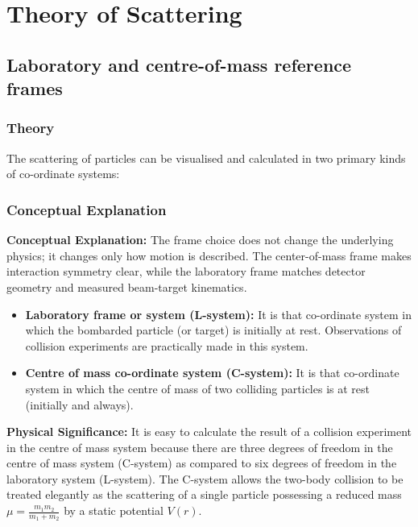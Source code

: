 \documentclass[12pt]{report}
\begin{document}
\endgroup

\tableofcontents
\newpage

\cleardoublepage
\hypersetup{pageanchor=true}
\setcounter{page}{1}

\chapter{Theory of Scattering}
\section{Laboratory and centre-of-mass reference frames}



\subsection*{Theory}
The scattering of particles can be visualised and calculated in two primary kinds of co-ordinate systems: 


\subsection{Conceptual Explanation}
\textbf{Conceptual Explanation:} The frame choice does not change the underlying physics; it changes only how motion is described. The center-of-mass frame makes interaction symmetry clear, while the laboratory frame matches detector geometry and measured beam-target kinematics.


\begin{itemize}
    \item \textbf{Laboratory frame or system (L-system):} It is that co-ordinate system in which the bombarded particle (or target) is initially at rest. Observations of collision experiments are practically made in this system.
    \item \textbf{Centre of mass co-ordinate system (C-system):} It is that co-ordinate system in which the centre of mass of two colliding particles is at rest (initially and always).
\end{itemize}

\textbf{Physical Significance:} It is easy to calculate the result of a collision experiment in the centre of mass system because there are three degrees of freedom in the centre of mass system (C-system) as compared to six degrees of freedom in the laboratory system (L-system). The C-system allows the two-body collision to be treated elegantly as the scattering of a single particle possessing a reduced mass $\mu = \frac{m_1 m_2}{m_1 + m_2}$ by a static potential $V(r)$.
\end{document}
